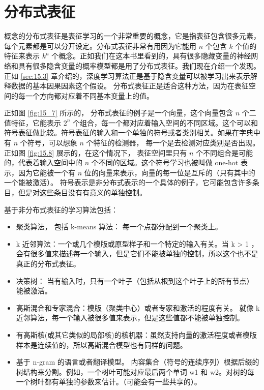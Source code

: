 
\section{分布式表征}
\label{sec:15.4}
概念的分布式表征是表征学习的一个非常重要的概念，它是指表征包含很多元素，每个元素都是可以分开设定。分布式表征非常有用因为它能用 $n$ 个包含 $k$ 个值的特征来表示 $k^n$ 个概念。正如我们在这本书里看到的，具有很多隐藏变量的神经网络和具有很多隐含变量的概率模型都是用了分布式表征。我们现在介绍一个发现。正如 \ref{sec:15.3} 章介绍的，深度学习算法正是基于隐含变量可以被学习出来表示解释数据的基本因果因素这个假设。 分布式表征正是适合这种方法，因为在表征空间的每一个方向都对应着不同基本变量上的值。

正如图 \ref{fig:15_7} 所示的， 分布式表征的例子是一个向量，这个向量包含 $n$ 个二值特征，它能表示 $2^n$ 个组合，每一个都对应着输入空间的不同区域。这个可以和符号表征做比较。符号表征的输入和一个单独的符号或者类别相关。如果在字典中有 $n$ 个符号，可以想象 $n$ 个特征的检测器， 每一个是去检测对应类别是否出现。正如图 \ref{fig:15.8} 展示的，在这个情况下， 表征空间里只有 $n$ 个不同组合是可能的，代表着输入空间中的 $n$ 个不同的区域。这个符号学习也被叫做 one-hot 表示，因为它能被一个有 $n$ 位的向量来表示，向量的每一位是互斥的（只有其中的一个能被激活）。 符号表示是非分布式表示的一个具体的例子，它可能包含许多条目，但是对这些条目没有有意义的单独控制。

基于非分布式表征的学习算法包括：
\begin{itemize}
	\item 聚类算法， 包括 k-means 算法： 每一个点都分配到一个聚类上。
	\item k 近邻算法：一个或几个模版或原型样子和一个特定的输入有关。当 k > 1 ，会有很多值来描述每一个输入，但是它们不能被单独的控制，所以这个也不是真正的分布式表征。
	\item 决策树： 当有输入时，只有一个叶子（包括从根到这个叶子上的所有节点）能被激活。
	\item 高斯混合和专家混合：模版（聚类中心）或者专家和激活的程度有关。 就像 k 近邻算法，每一个输入被很多值来表示，但是这些值都不能被单独控制。
	\item 有高斯核(或其它类似的局部核)的核机器：虽然支持向量的激活程度或者模版样本是连续值的，所以高斯混合模型也有同样的问题。
	\item 基于 n-gram 的语言或者翻译模型。 内容集合（符号的连续序列）根据后缀的树结构来分割。例如，一个树叶可能对应最后两个单词 w1 和 w2。对树的每一个树叶都有单独的参数来估计。（可能会有一些共享的）。
\end{itemize}


